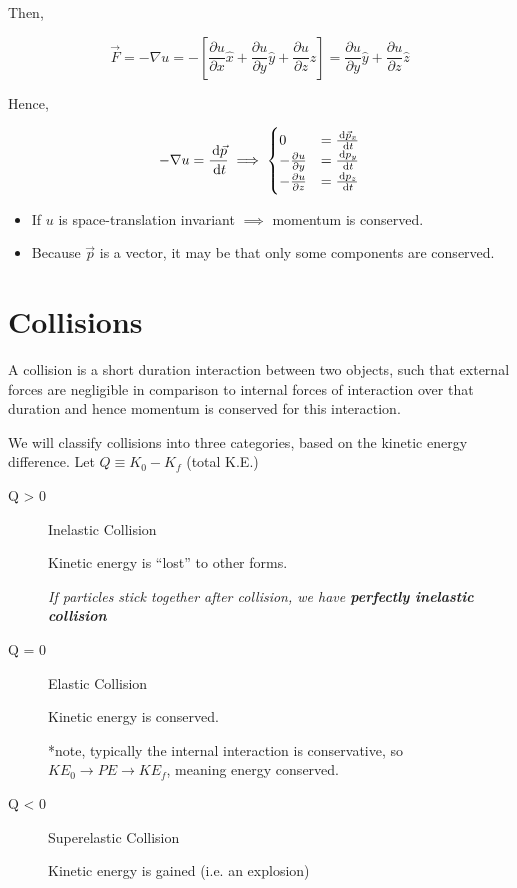 Then,

\begin{equation}
	\vec F = - \nabla u = - \left[\frac{\partial u}{\partial x} \hat x + \frac{\partial u}{\partial y} \hat y + \frac{\partial u}{\partial z} \hat z\right] = \frac{\partial u}{\partial y} \hat y + \frac{\partial u}{\partial z} \hat z
\end{equation}

Hence,

\begin{equation}
	-\nabla u = \frac{\D \vec p}{\D t} \implies \begin{cases}
		0 &= \frac{\D \vec p_x}{\D t}\\
		- \frac{\partial u}{\partial y} &= \frac{\D p_y}{\D t}\\
		- \frac{\partial u}{\partial z} &= \frac{\D p_z}{\D t}
	\end{cases}
\end{equation}

\begin{itemize}
	\item If $u$ is space-translation invariant $\implies$ momentum is conserved.
	\item Because $\vec p$ is a vector, it may be that only some components are conserved.
\end{itemize}

\section{Collisions}

A collision is a short duration interaction between two objects, such that external forces are negligible in comparison to internal forces of interaction over that duration and hence momentum is conserved for this interaction.

We will classify collisions into three categories, based on the kinetic energy difference. Let $Q \equiv K_0 - K_f$ (total K.E.)

\begin{description}
	\item[Q > 0] Inelastic Collision
	
	Kinetic energy is ``lost'' to other forms.

	\textit{If particles stick together after collision, we have \textbf{perfectly inelastic collision}}

	\item[Q = 0] Elastic Collision

	Kinetic energy is conserved.

	*note, typically the internal interaction is conservative, so $KE_0 \to PE \to KE_f$, meaning energy conserved.

	\item[Q < 0] Superelastic Collision
	
	Kinetic energy is gained (i.e. an explosion)
\end{description}

